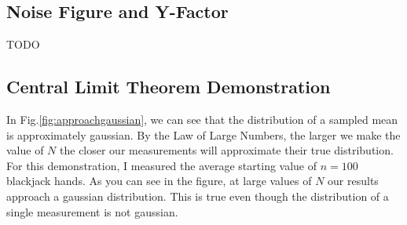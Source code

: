 \documentclass[12pt]{article}
\begin{document}
\subsection*{Noise Figure and Y-Factor}
TODO

\subsection*{Central Limit Theorem Demonstration}
In Fig.\ref{fig:approachgaussian}, we can see that the distribution of a sampled mean is approximately gaussian. By the Law of Large Numbers, the larger we make the value of $N$ the closer our measurements will approximate their true distribution. For this demonstration, I measured the average starting value of $n=100$ blackjack hands. As you can see in the figure, at large values of $N$ our results approach a gaussian distribution. This is true even though the distribution of a single measurement is not gaussian.
\end{document}
